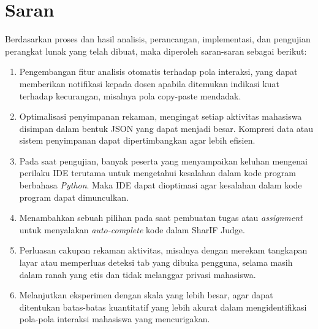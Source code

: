 \section{Saran}
Berdasarkan proses dan hasil analisis, perancangan, implementasi, dan pengujian perangkat lunak yang telah dibuat, maka diperoleh saran-saran sebagai berikut:

\begin{enumerate}
	\item Pengembangan fitur analisis otomatis terhadap pola interaksi, yang dapat memberikan notifikasi kepada dosen apabila ditemukan indikasi kuat terhadap kecurangan, misalnya pola copy-paste mendadak.
	\item Optimalisasi penyimpanan rekaman, mengingat setiap aktivitas mahasiswa disimpan dalam bentuk JSON yang dapat menjadi besar. Kompresi data atau sistem penyimpanan dapat dipertimbangkan agar lebih efisien.
	\item Pada saat pengujian, banyak peserta yang menyampaikan keluhan mengenai perilaku IDE terutama untuk mengetahui kesalahan dalam kode program berbahasa \textit{Python}. Maka IDE dapat dioptimasi agar kesalahan dalam kode program dapat dimunculkan.
	\item Menambahkan sebuah pilihan pada saat pembuatan tugas atau \textit{assignment} untuk menyalakan \textit{auto-complete} kode dalam SharIF Judge.
	\item Perluasan cakupan rekaman aktivitas, misalnya dengan merekam tangkapan layar atau memperluas deteksi tab yang dibuka pengguna, selama masih dalam ranah yang etis dan tidak melanggar privasi mahasiswa.
	\item Melanjutkan eksperimen dengan skala yang lebih besar, agar dapat ditentukan batas-batas kuantitatif yang lebih akurat dalam mengidentifikasi pola-pola interaksi mahasiswa yang mencurigakan.
\end{enumerate}